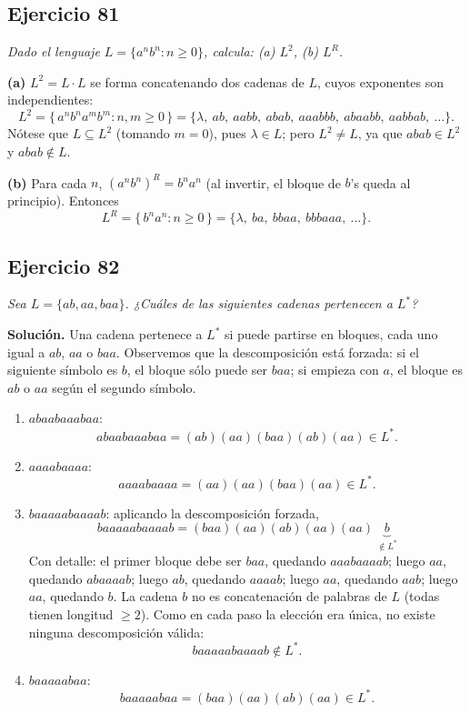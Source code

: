 \subsection*{Ejercicio 81}

\noindent\textit{Dado el lenguaje $L = \{a^n b^n : n \geq 0\}$, calcula: (a) $L^2$,
    (b) $L^R$.}

\medskip
\noindent\textbf{(a)} $L^2 = L \cdot L$ se forma concatenando dos cadenas de $L$,
cuyos exponentes son independientes:
\[
L^2 = \{\, a^n b^n a^m b^m : n, m \geq 0 \,\}
= \{\lambda,\ ab,\ aabb,\ abab,\ aaabbb,\ abaabb,\ aabbab,\ \dots\}.
\]
Nótese que $L \subseteq L^2$ (tomando $m = 0$), pues $\lambda \in L$; pero
$L^2 \neq L$, ya que $abab \in L^2$ y $abab \notin L$.

\medskip
\noindent\textbf{(b)} Para cada $n$, $(a^n b^n)^R = b^n a^n$ (al invertir, el bloque
de $b$'s queda al principio). Entonces
\[
L^R = \{\, b^n a^n : n \geq 0 \,\} = \{\lambda,\ ba,\ bbaa,\ bbbaaa,\ \dots\}.
\]

\subsection*{Ejercicio 82}

\noindent\textit{Sea $L = \{ab, aa, baa\}$. ¿Cuáles de las siguientes cadenas
    pertenecen a $L^*$?}

\medskip
\noindent\textbf{Solución.} Una cadena pertenece a $L^*$ si puede partirse en
bloques, cada uno igual a $ab$, $aa$ o $baa$. Observemos que la descomposición
está forzada: si el siguiente símbolo es $b$, el bloque sólo puede ser $baa$; si
empieza con $a$, el bloque es $ab$ o $aa$ según el segundo símbolo.

\begin{enumerate}
    \item[(a)] $abaabaaabaa$:
    \[
    abaabaaabaa = (ab)(aa)(baa)(ab)(aa) \in L^* .
    \]
    \item[(b)] $aaaabaaaa$:
    \[
    aaaabaaaa = (aa)(aa)(baa)(aa) \in L^* .
    \]
    \item[(c)] $baaaaabaaaab$: aplicando la descomposición forzada,
    \[
    baaaaabaaaab = (baa)(aa)(ab)(aa)(aa)\ \underbrace{b}_{\notin L^*}
    \]
    Con detalle: el primer bloque debe ser $baa$, quedando $aaabaaaab$;
    luego $aa$, quedando $abaaaab$; luego $ab$, quedando $aaaab$; luego $aa$,
    quedando $aab$; luego $aa$, quedando $b$. La cadena $b$ no es
    concatenación de palabras de $L$ (todas tienen longitud $\geq 2$). Como en
    cada paso la elección era única, no existe ninguna descomposición válida:
    \[
    baaaaabaaaab \notin L^* .
    \]
    \item[(d)] $baaaaabaa$:
    \[
    baaaaabaa = (baa)(aa)(ab)(aa) \in L^* .
    \]
\end{enumerate}

